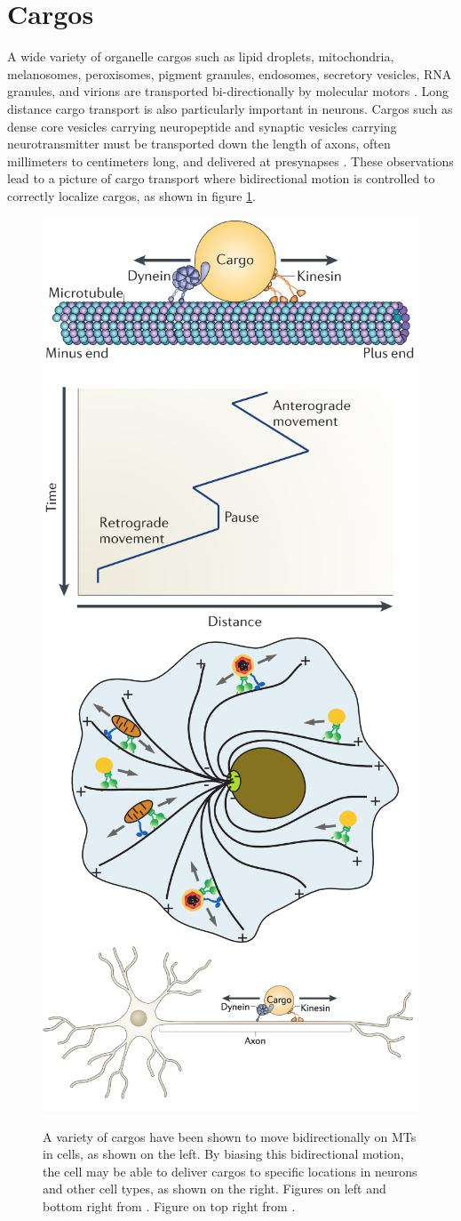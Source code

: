 \section{Cargos}

A wide variety of organelle cargos such as lipid droplets, mitochondria, melanosomes, peroxisomes, pigment granules, endosomes, secretory vesicles, RNA granules, and virions are transported bi-directionally by molecular motors \cite{Hancock2014,Gross2004}. Long distance cargo transport is also particularly important in neurons. Cargos such as dense core vesicles carrying neuropeptide and synaptic vesicles carrying neurotransmitter must be transported down the length of axons, often millimeters to centimeters long, and delivered at presynapses \cite{Maeder2014}. These observations lead to a picture of cargo transport where bidirectional motion is controlled to correctly localize cargos, as shown in figure \ref{fig:cargo_delivery}.

\begin{figure}
\centering
\includegraphics[width=.45 \textwidth]{background/bidirectional_motion}
\includegraphics[width=.45 \textwidth]{background/cargo_delivery}
\caption[Bidirectional motion and cargo delivery]{A variety of cargos have been shown to move bidirectionally on MTs in cells, as shown on the left. By biasing this bidirectional motion, the cell may be able to deliver cargos to specific locations in neurons and other cell types, as shown on the right. Figures on left and bottom right from \cite{Hancock2014}. Figure on top right from \cite{Gross2004}.}
\label{fig:cargo_delivery}
\end{figure}


